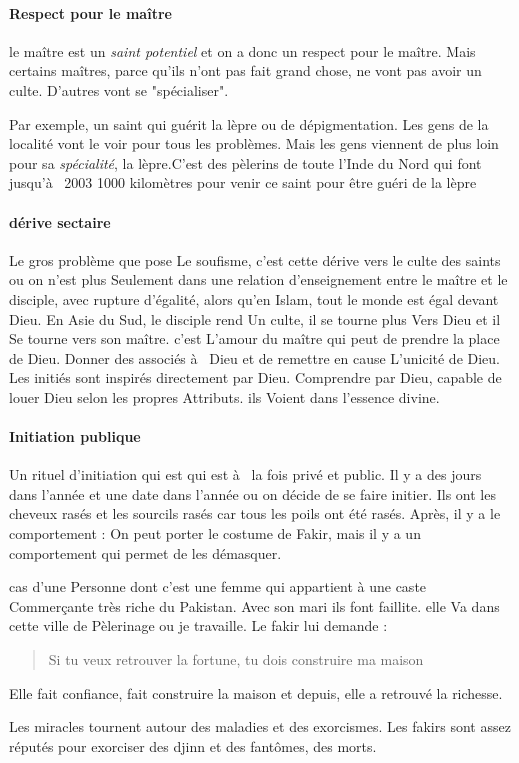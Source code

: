 \paragraph{Respect pour le maître} le maître est un \textit{saint potentiel} et on a donc un respect pour le maître. Mais certains maîtres, parce qu'ils n'ont pas fait grand chose, ne vont pas avoir un culte. D'autres vont se "spécialiser". 
\begin{Ex}
    Par exemple, un saint qui guérit la lèpre ou de dépigmentation. Les gens de la localité vont le voir pour tous les problèmes. Mais les gens viennent de plus loin pour sa \textit{spécialité}, la lèpre.C'est des pèlerins 
de toute l'Inde du Nord qui  font jusqu'à  
2003 1000 kilomètres pour venir ce saint pour être guéri 
de la lèpre 

\end{Ex}

\paragraph{dérive sectaire} 
Le gros problème que pose 
Le soufisme, c'est cette dérive vers le culte des saints ou on n'est plus 
Seulement dans une relation d'enseignement entre le maître 
et le disciple, avec rupture d'égalité, alors qu'en Islam, tout le monde est égal devant Dieu. 
En Asie du Sud, le disciple rend 
Un culte, il se tourne plus 
Vers Dieu et il 
Se tourne vers son maître. c'est 
L'amour du maître qui peut de prendre la place de Dieu. Donner des associés à  Dieu et  de remettre 
en cause 
L'unicité 
de Dieu.
Les initiés sont inspirés directement par Dieu. Comprendre par Dieu, capable de louer Dieu selon les propres 
Attributs. ils Voient dans l'essence divine.

\paragraph{Initiation publique}
Un rituel d'initiation qui  est qui  est à  la fois privé et public. Il y a des jours dans l'année et une date dans l'année ou on décide de se faire initier. Ils ont les cheveux rasés et les sourcils rasés car tous les poils ont été rasés. 
Après, il y a 
le comportement : On peut porter le costume de Fakir, mais il y a un comportement qui permet de les démasquer.
\begin{Ex}
  cas d'une 
Personne dont c'est une femme qui  appartient 
à  une caste 
Commerçante très riche du Pakistan. Avec son mari ils font faillite.  elle 
Va dans cette ville de 
Pèlerinage ou je travaille. Le fakir lui demande : 
\begin{quote}
    Si tu veux retrouver la fortune, tu dois construire ma maison  
\end{quote}
Elle fait confiance, fait construire la maison et depuis, elle a retrouvé la richesse.
\end{Ex}
Les miracles tournent autour des maladies et des exorcismes. 
Les fakirs sont assez réputés pour exorciser des djinn et des fantômes, des morts. 

